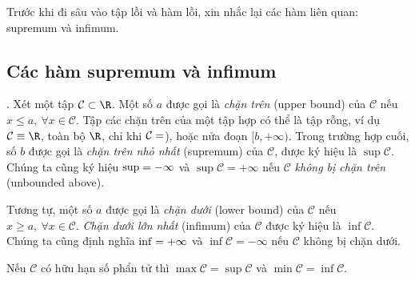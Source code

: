 Trước khi đi sâu vào tập lồi và hàm lồi, xin nhắc lại các hàm liên quan: supremum và infimum. 

\subsection{Các hàm supremum và infimum}

.
\def\CC{\mathcal{C}}
Xét một tập $\mathcal{C} \subset \R$. Một số $a$ được gọi là \textit{chặn trên} (upper bound) của $\CC$ nếu   $x \leq a, ~ \forall x \in \CC$. Tập các chặn trên của một tập hợp có thể là tập rỗng, ví dụ $\CC \equiv \R$, toàn bộ $\R$, chỉ khi $\CC = \empty$), hoặc nửa đoạn $[b, +\infty)$. Trong trường hợp cuối, số $b$ được gọi là \textit{chặn trên nhỏ nhất} (supremum) của $\CC$, được ký hiệu là $\sup \CC$. Chúng ta cũng ký hiệu $\sup \empty = -\infty$ và $\sup \CC = +\infty$ nếu $\CC$ \textit{không bị chặn trên} (unbounded above). 

Tương tự, một số $a$ được gọi là \textit{chặn dưới} (lower bound) của $\CC$ nếu $x \geq a, ~\forall x \in \CC$. \textit{Chặn dưới lớn nhất} (infimum) của $\CC$ được ký hiệu là $\inf \CC$. Chúng ta cũng định nghĩa $\inf \empty = +\infty$ và $\inf \CC  = -\infty$ nếu $\CC$ không bị chặn dưới. 

Nếu $\CC$ có hữu hạn số phẩn tử thì $\max \CC = \sup \CC$ và $\min \CC = \inf \CC$.

